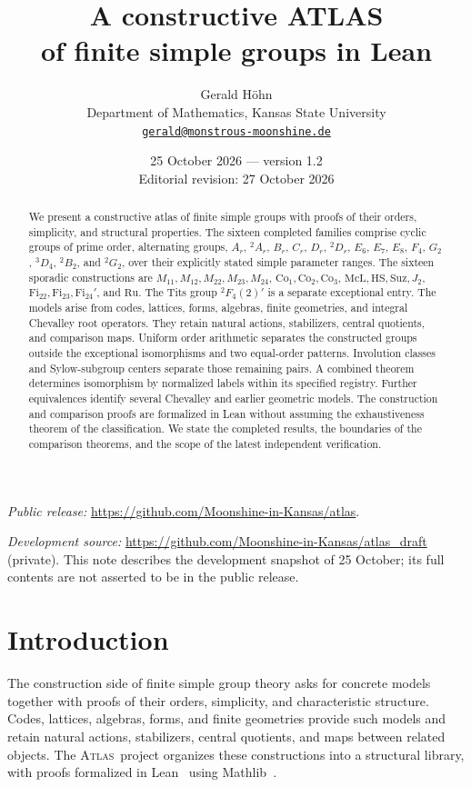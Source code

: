 \documentclass[11pt]{article}
\title{A constructive ATLAS\\of finite simple groups in Lean}
\author{Gerald H\"ohn\\[3pt]
  \small Department of Mathematics, Kansas State University\\
  \small\href{mailto:gerald@monstrous-moonshine.de}{\nolinkurl{gerald@monstrous-moonshine.de}}}
\date{25 October 2026 --- version 1.2\\
  \small Editorial revision: 27 October 2026}
\numberwithin{equation}{section}
\theoremstyle{definition}
\newcommand{\Co}{\mathrm{Co}}
\newcommand{\Fi}{\mathrm{Fi}}
\newcommand{\Suz}{\mathrm{Suz}}
\newcommand{\atlas}{\textsc{Atlas}}
\begin{document}
\maketitle


\begin{abstract}
We present a constructive atlas of finite simple groups with proofs of
their orders, simplicity, and structural properties. The sixteen completed
families comprise cyclic groups of prime order, alternating groups,
$A_r$, ${}^2A_r$, $B_r$, $C_r$, $D_r$, ${}^2D_r$, $E_6$, $E_7$, $E_8$,
$F_4$, $G_2$, ${}^3D_4$, ${}^2B_2$, and ${}^2G_2$, over their explicitly
stated simple parameter ranges. The sixteen sporadic constructions are
$M_{11},M_{12},M_{22},M_{23},M_{24}$, $\Co_1,\Co_2,\Co_3$,
$\mathrm{McL},\mathrm{HS},\Suz,J_2$, $\Fi_{22},\Fi_{23},\Fi_{24}'$,
and $\mathrm{Ru}$. The Tits group ${}^2F_4(2)'$ is a separate exceptional
entry. The models arise from codes, lattices, forms, algebras, finite
geometries, and integral Chevalley root operators. They retain natural
actions, stabilizers, central quotients, and comparison maps.
Uniform order arithmetic separates the constructed groups outside the
exceptional isomorphisms and two equal-order patterns. Involution classes
and Sylow-subgroup centers separate those remaining pairs. A combined
theorem determines isomorphism by normalized labels within its specified
registry. Further equivalences identify several Chevalley and
earlier geometric models. The construction and comparison proofs are
formalized in Lean without assuming the exhaustiveness theorem of the
classification. We state the completed results, the boundaries of the
comparison theorems, and the scope of the latest independent verification.

\end{abstract}

\smallskip
\noindent\textit{Public release:}
\mbox{\url{https://github.com/Moonshine-in-Kansas/atlas}}.\par
\noindent\textit{Development source:}
\mbox{\url{https://github.com/Moonshine-in-Kansas/atlas_draft}}
(private). This note describes the development snapshot of 25 October;
its full contents are not asserted to be in the public release.

\section{Introduction}

The construction side of finite simple group theory asks for concrete
models together with proofs of their orders, simplicity, and
characteristic structure. Codes, lattices, algebras, forms, and finite
geometries provide such models and retain natural actions, stabilizers,
central quotients, and maps between related objects. The \atlas\ project
organizes these constructions into a structural library, with proofs
formalized in Lean~\cite{Lean4} using Mathlib~\cite{Mathlib}.
\end{document}
